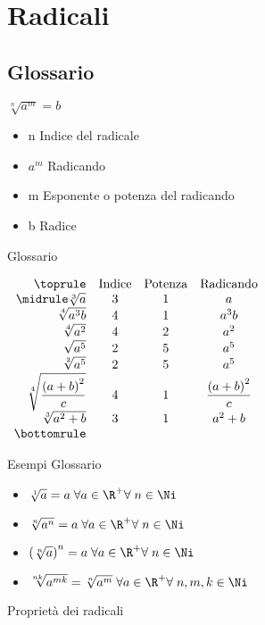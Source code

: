 \chapter{Radicali}
\label{Radicaliradici}
\section{Glossario}
\begin{table}[H]
\centering
$\sqrt[n]{a^m}=b$
\begin{itemize}
\item n Indice del radicale
\item $a^m$ Radicando
\item m Esponente o potenza del radicando
\item b Radice
\end{itemize}
\caption{Glossario}
\label{tab:RadicaliGlossario}
\end{table}
\begin{table}[H]
\centering
$
\begin{array}{rccc}
\toprule
 &\text{Indice} & \text{Potenza} & \text{Radicando} \\ 
 \midrule
 \sqrt[3]{a}& 3 &1  & a \\ 
 \sqrt[4]{a^3b}& 4 &1  & a^3b \\ 
 \sqrt[4]{a^2}& 4 &2  & a^2 \\
\sqrt{a^5}& 2 &5 & a^5 \\ 
\sqrt[2]{a^5}& 2 &5 & a^5 \\ 
\sqrt[4]{\dfrac{\left( a+b\right)^2 }{c}}& 4 &1 &\dfrac{\left( a+b\right)^2 }{c} \\
\sqrt[3]{a^2+b}& 3 &1 & a^2+b\\
\bottomrule	
\end{array}
$ 
\label{tab:esempiglossario}
\caption{Esempi Glossario}
\end{table}

\begin{table}[H]
\centering
\begin{itemize}
	\item $\sqrt[1]{a}=a\; \forall a\in\R^{+}\forall\; n\in\Ni$
	\item $\sqrt[n]{a^n}=a\; \forall a\in\R^{+}\forall\; n\in\Ni$
	\item $\left(\sqrt[n]{a}\right)^n=a\; \forall a\in\R^{+}\forall\; n\in\Ni$
	\item $\sqrt[nk]{a^{mk}}=\sqrt[n]{a^m}\;  \forall a\in\R^{+}\forall\; n,m,k\in\Ni$\label{Rad:invariantiva}
\end{itemize}
\label{tab:propRadicli}
\caption{Proprietà dei radicali}
\end{table}
